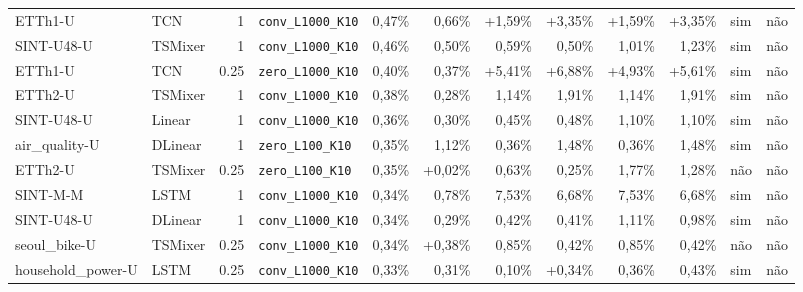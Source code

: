\begin{longtable}{llrlrrrrrrll}
ETTh1-U & TCN & 1 & \texttt{conv\_\allowbreak{}L1000\_\allowbreak{}K10} & \textminus{}0,47\% & \textminus{}0,66\% & +1,59\% & +3,35\% & +1,59\% & +3,35\% & sim & n\~ao \\
SINT-U48-U & TSMixer & 1 & \texttt{conv\_\allowbreak{}L1000\_\allowbreak{}K10} & \textminus{}0,46\% & \textminus{}0,50\% & \textminus{}0,59\% & \textminus{}0,50\% & \textminus{}1,01\% & \textminus{}1,23\% & sim & n\~ao \\
ETTh1-U & TCN & 0.25 & \texttt{zero\_\allowbreak{}L1000\_\allowbreak{}K10} & \textminus{}0,40\% & \textminus{}0,37\% & +5,41\% & +6,88\% & +4,93\% & +5,61\% & sim & n\~ao \\
ETTh2-U & TSMixer & 1 & \texttt{conv\_\allowbreak{}L1000\_\allowbreak{}K10} & \textminus{}0,38\% & \textminus{}0,28\% & \textminus{}1,14\% & \textminus{}1,91\% & \textminus{}1,14\% & \textminus{}1,91\% & sim & n\~ao \\
SINT-U48-U & Linear & 1 & \texttt{conv\_\allowbreak{}L1000\_\allowbreak{}K10} & \textminus{}0,36\% & \textminus{}0,30\% & \textminus{}0,45\% & \textminus{}0,48\% & \textminus{}1,10\% & \textminus{}1,10\% & sim & n\~ao \\
air\_quality-U & DLinear & 1 & \texttt{zero\_\allowbreak{}L100\_\allowbreak{}K10} & \textminus{}0,35\% & \textminus{}1,12\% & \textminus{}0,36\% & \textminus{}1,48\% & \textminus{}0,36\% & \textminus{}1,48\% & sim & n\~ao \\
ETTh2-U & TSMixer & 0.25 & \texttt{zero\_\allowbreak{}L100\_\allowbreak{}K10} & \textminus{}0,35\% & +0,02\% & \textminus{}0,63\% & \textminus{}0,25\% & \textminus{}1,77\% & \textminus{}1,28\% & n\~ao & n\~ao \\
SINT-M-M & LSTM & 1 & \texttt{conv\_\allowbreak{}L1000\_\allowbreak{}K10} & \textminus{}0,34\% & \textminus{}0,78\% & \textminus{}7,53\% & \textminus{}6,68\% & \textminus{}7,53\% & \textminus{}6,68\% & sim & n\~ao \\
SINT-U48-U & DLinear & 1 & \texttt{conv\_\allowbreak{}L1000\_\allowbreak{}K10} & \textminus{}0,34\% & \textminus{}0,29\% & \textminus{}0,42\% & \textminus{}0,41\% & \textminus{}1,11\% & \textminus{}0,98\% & sim & n\~ao \\
seoul\_bike-U & TSMixer & 0.25 & \texttt{conv\_\allowbreak{}L1000\_\allowbreak{}K10} & \textminus{}0,34\% & +0,38\% & \textminus{}0,85\% & \textminus{}0,42\% & \textminus{}0,85\% & \textminus{}0,42\% & n\~ao & n\~ao \\
household\_power-U & LSTM & 0.25 & \texttt{conv\_\allowbreak{}L1000\_\allowbreak{}K10} & \textminus{}0,33\% & \textminus{}0,31\% & \textminus{}0,10\% & +0,34\% & \textminus{}0,36\% & \textminus{}0,43\% & sim & n\~ao \\

\end{longtable}
